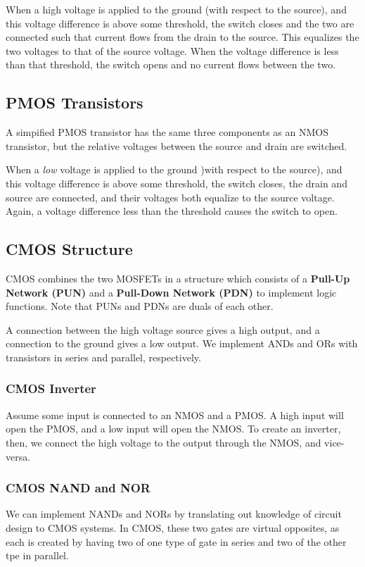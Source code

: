 \documentclass[12pt]{article}
\begin{document}
When a high voltage is applied to the ground (with respect to the source), and this voltage difference is above some threshold, the switch closes and the two are connected such that current flows from the drain to the source. This equalizes the two voltages to that of the source voltage. When the voltage difference is less than that threshold, the switch opens and no current flows between the two.

\subsection*{PMOS Transistors}
A simpified PMOS transistor has the same three components as an NMOS transistor, but the relative voltages between the source and drain are switched.

When a \emph{low} voltage is applied to the ground )with respect to the source), and this voltage difference is above some threshold, the switch closes, the drain and source are connected, and their voltages both equalize to the source voltage. Again, a voltage difference less than the threshold causes the switch to open.

\subsection*{CMOS Structure}
CMOS combines the two MOSFETs in a structure which consists of a {\bf Pull-Up Network (PUN)} and a {\bf Pull-Down Network (PDN)} to implement logic functions. Note that PUNs and PDNs are duals of each other.

A connection between the high voltage source gives a high output, and a connection to the ground gives a low output. We implement ANDs and ORs with transistors in series and parallel, respectively.

\subsubsection*{CMOS Inverter}
Assume some input is connected to an NMOS and a PMOS. A high input will open the PMOS, and a low input will open the NMOS. To create an inverter, then, we connect the high voltage to the output through the NMOS, and vice-versa.

\subsubsection*{CMOS NAND and NOR}
We can implement NANDs and NORs by translating out knowledge of circuit design to CMOS systems. In CMOS, these two gates are virtual opposites, as each is created by having two of one type of gate in series and two of the other tpe in parallel.
\end{document}
